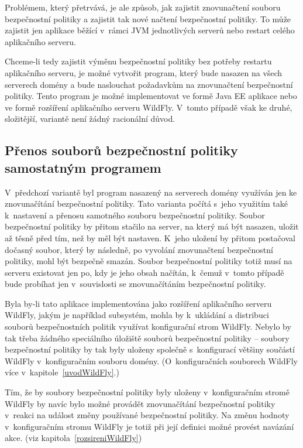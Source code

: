 Problémem, který přetrvává, je ale způsob, jak zajistit znovunačtení souboru bezpečnostní politiky a zajistit tak nové načtení bezpečnostní politiky.
To může zajistit jen aplikace běžící v~rámci JVM jednotlivých serverů nebo restart celého aplikačního serveru.

Chceme-li tedy zajistit výměnu bezpečnostní politiky bez potřeby restartu aplikačního serveru, je možné vytvořit program,
který bude nasazen na všech serverech domény a bude naslouchat požadavkům na znovunačtení bezpečnostní politiky.
Tento program je možné implementovat ve formě Java EE aplikace nebo ve formě rozšíření aplikačního serveru WildFly.
V~tomto případě však ke druhé, složitější, variantě není žádný racionální důvod.

\subsection{Přenos souborů bezpečnostní politiky samostatným programem} \label{reseniProgramem}

V~předchozí variantě byl program nasazený na serverech domény využíván jen ke znovunačítání bezpečnostní politiky.
Tato varianta počítá s~jeho využitím také k~nastavení a přenosu samotného souboru bezpečnostní politiky.
Soubor bezpečnostní politiky by přitom stačilo na server, na který má být nasazen, uložit až těsně před tím, než by měl být nastaven.
K~jeho uložení by přitom postačoval dočasný soubor, který by následně, po vyvolání znovunačtení bezpečnostní politiky, mohl být bezpečně smazán.
Soubor bezpečnostní politiky totiž musí na serveru existovat jen po, kdy je jeho obsah načítán,
k~čemuž v~tomto případě bude probíhat jen v~souvislosti se znovunačítáním bezpečnostní politiky.

Byla by-li tato aplikace implementována jako rozšíření aplikačního serveru WildFly, jakým je například subsystém,
mohla by k~ukládání a distribuci souborů bezpečnostních politik využívat konfigurační strom WildFly.
Nebylo by tak třeba žádného speciálního úložiště souborů bezpečnostní politiky -- soubory bezpečnostní politiky
by tak byly uloženy společně s~konfigurací většiny součástí WildFly v~konfiguračním souboru domény.
(O~konfiguračních souborech WildFly více v~kapitole~\ref{uvodWildFly}.)

Tím, že by soubory bezpečnostní politiky byly uloženy v~konfiguračním stromě WildFly by navíc bylo možné provádět znovunačítání
bezpečnostní politiky v~reakci na událost změny používané bezpečnostní politiky.
Na změnu hodnoty v~konfiguračním stromu WildFly je totiž při její definici možné provést navázání akce. (viz kapitola~\ref{rozsireniWildFly})

